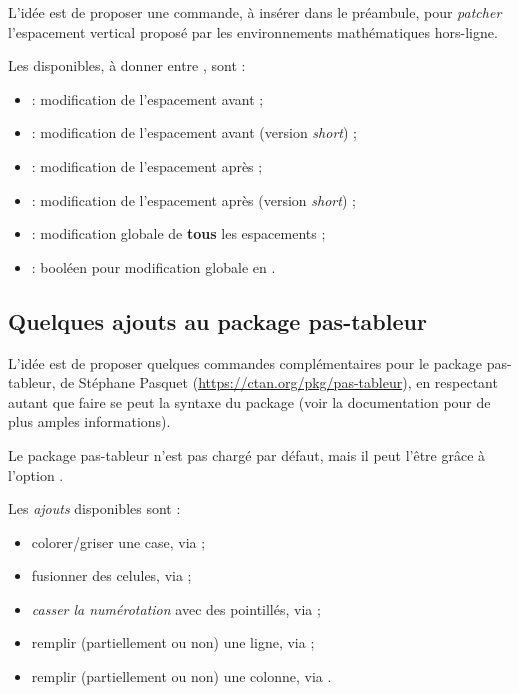 \documentclass[french,11pt,a4paper]{article}
\begin{document}
L'idée est de proposer une commande, à insérer dans le préambule, pour \textit{patcher} l'espacement vertical proposé par les environnements mathématiques hors-ligne.


Les  disponibles, à donner entre \MontreCode{[...]}, sont :

\begin{itemize}
	\item {} : modification de l'espacement avant ;
	\item {} : modification de l'espacement avant (version \textit{short}) ;
	\item {} : modification de l'espacement après ;
	\item {} : modification de l'espacement après (version \textit{short}) ;
	\item {} : modification globale de \textbf{tous} les espacements ;
	\item {} : booléen pour modification globale en .
\end{itemize}

\subsection{Quelques ajouts au package pas-tableur}

L'idée est de proposer quelques commandes complémentaires pour le package \textsf{pas-tableur}, de Stéphane Pasquet (\url{https://ctan.org/pkg/pas-tableur}), en respectant autant que faire se peut la syntaxe du package (voir la documentation pour de plus amples informations).

\smallskip

Le package \textsf{pas-tableur} n'est pas chargé par défaut, mais il peut l'être grâce à l'option \MontreCode{[pastableur]}.

\smallskip

Les \textit{ajouts} disponibles sont :

\begin{itemize}
	\item colorer/griser une case, via  ;
	\item fusionner des celules, via  ;
	\item \textit{casser la numérotation} avec des pointillés, via  ;
	\item remplir (partiellement ou non) une ligne,  via  ;
	\item remplir (partiellement ou non) une colonne,  via .
\end{itemize}
\end{document}
